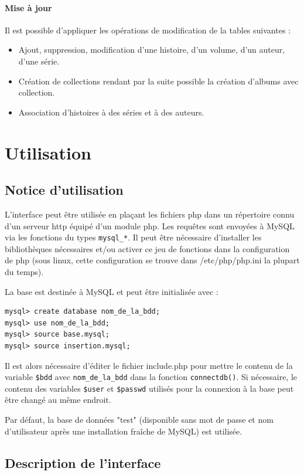 \documentclass[12pt]{article}
\begin{document}
\paragraph{Mise à jour}
Il est possible d'appliquer les opérations de modification de la tables
suivantes :
\begin{itemize}
	\item Ajout, suppression, modification d’une histoire, d’un volume, d’un
		auteur, d'une série.
	\item Création de collections rendant par la suite possible la création
		d'albums avec collection.
	\item Association d'histoires à des séries et à des auteurs.
\end{itemize}


\section{Utilisation}

\subsection{Notice d'utilisation}

L'interface peut être utilisée en plaçant les fichiers php dans un répertoire
connu d'un serveur http équipé d'un module php. Les requêtes sont envoyées à
MySQL via les fonctions du types \verb!mysql_*!. Il peut être nécessaire
d'installer les bibliothèques nécessaires et/ou activer ce jeu de fonctions
dans la configuration de php (sous linux, cette configuration se trouve dans
/etc/php/php.ini la plupart du temps).

La base est destinée à MySQL et peut être initialisée avec :
\begin{verbatim}
mysql> create database nom_de_la_bdd;
mysql> use nom_de_la_bdd;
mysql> source base.mysql;
mysql> source insertion.mysql;
\end{verbatim}

Il est alors nécessaire d'éditer le fichier include.php pour mettre le contenu
de la variable \verb!$bdd! avec \verb!nom_de_la_bdd! dans la fonction
\verb!connectdb()!. Si nécessaire, le contenu des variables \verb!$user! et
\verb!$passwd! utilisés pour la connexion à la base peut être changé au même
endroit.

Par défaut, la base de données "test" (disponible sans mot de passe et nom
d'utilisateur après une installation fraîche de MySQL) est utilisée.


\subsection{Description de l'interface}
\end{document}
